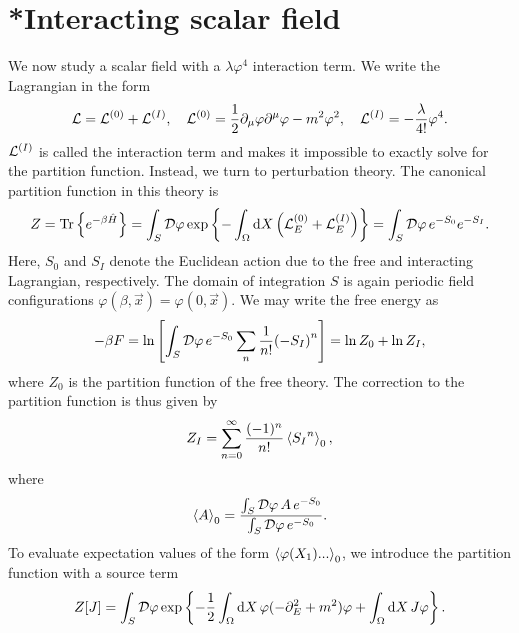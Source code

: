 \section{*Interacting scalar field}
\label{section: interacting scalar}


We now study a scalar field with a $\lambda \varphi^4$ interaction term.
We write the Lagrangian in the form
%
\begin{equation}
    \mathcal{L} = \mathcal{L}^{(0)} + \mathcal{L}^{(I)}, \quad 
    \mathcal{L}^{(0)} = 
    \frac{1}{2} \partial_\mu \varphi \partial^\mu \varphi - m^2 \varphi^2 , \quad
    \mathcal{L}^{(I)} = - \frac{\lambda}{4!} \varphi^4.
\end{equation}
%
$\mathcal{L}^{(I)}$ is called the interaction term and makes it impossible to exactly solve for the partition function.
Instead, we turn to perturbation theory.
The canonical partition function in this theory is
%
\begin{equation}
    Z = \text{Tr} \left\{ e^{- \beta \hat H} \right\}
    = \int_S \mathcal D \varphi \, \text{exp} \left\{ 
        - \int_\Omega \text{d} X \left(\mathcal{L}_E^{(0)} + \mathcal{L}_E^{(I)}\right)
     \right\}
    = \int_S \mathcal D \varphi \, e^{-S_0} e^{-S_I}.
\end{equation}
%
Here, $S_0$ and $S_I$ denote the Euclidean action due to the free and interacting Lagrangian, respectively.
The domain of integration $S$ is again periodic field configurations $\varphi(\beta, \vec x) = \varphi(0, \vec x)$.
We may write the free energy as
%
\begin{equation}
    - \beta F = \ln
    \left[
        \int_S \mathcal D \varphi \, e^{-S_0} \sum_n \frac{1}{n!} {(-S_I)}^n
    \right]
    = \ln Z_0 
    + \ln Z_I ,
\end{equation}
%
where $Z_0$ is the partition function of the free theory.
The correction to the partition function is thus given by
%
\begin{equation}
    Z_I = \sum_{n=0}^\infty \frac{(-1)^n}{n!} \left\langle {S_I}^n \right\rangle_0,
\end{equation}
%
where
%
\begin{equation}
    \left\langle A \right\rangle_0 = \frac{
        \int_S \mathcal D \varphi \, A \, e^{-S_0} }
    {\int_S \mathcal D \varphi \, e^{-S_0}}.
\end{equation}
%
To evaluate expectation values of the form $\left\langle \varphi(X_1) ...  \right\rangle_0$, we introduce the partition function with a source term
%
\begin{align}
    Z[J] = \int_S \mathcal D \varphi \, \text{exp} \left\{ 
        - \frac{1}{2} \int_\Omega \text{d} X \, \varphi (-\partial_E^2 + m^2) \varphi
        + \int_\Omega \text{d} X \, J \varphi
     \right\}.
\end{align}
